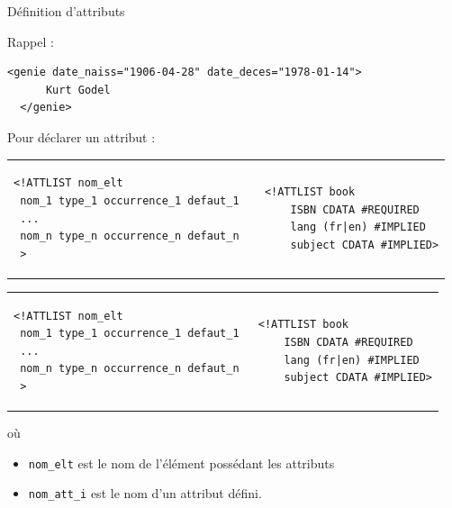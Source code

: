 \begin{frame}{Définition d'attributs}

Rappel :
\begin{lstlisting}[caption={élément \texttt{genie} et ses attributs}]
  <genie date_naiss="1906-04-28" date_deces="1978-01-14">
      Kurt Godel
  </genie>
\end{lstlisting}

\bigskip

Pour déclarer un attribut : \\

\medskip

\begin{tabular}{ll}
\begin{minipage}{0.55\textwidth}
\begin{small}
\begin{verbatim}
<!ATTLIST nom_elt
 nom_1 type_1 occurrence_1 defaut_1  
 ...
 nom_n type_n occurrence_n defaut_n
 > 
\end{verbatim}
\end{small}
\end{minipage}
&
\begin{minipage}{0.40\textwidth}
\begin{lstlisting}
<!ATTLIST book
    ISBN CDATA #REQUIRED 
    lang (fr|en) #IMPLIED
    subject CDATA #IMPLIED>
\end{lstlisting}
\end{minipage}\\
\end{tabular}

\framebreak

\begin{tabular}{ll}
\begin{minipage}{0.55\textwidth}
\begin{small}
\begin{verbatim}
<!ATTLIST nom_elt
 nom_1 type_1 occurrence_1 defaut_1 
 ...
 nom_n type_n occurrence_n defaut_n
 > 
\end{verbatim}
\end{small}
\end{minipage}
&
\begin{minipage}{0.40\textwidth}
\begin{lstlisting}
<!ATTLIST book
    ISBN CDATA #REQUIRED 
    lang (fr|en) #IMPLIED
    subject CDATA #IMPLIED>
\end{lstlisting}
\end{minipage}\\
\end{tabular}
où\\
\begin{itemize}
\item \texttt{nom\_elt} est le nom de l'élément possédant les attributs 
\item \texttt{nom\_att\_i}  est le nom d'un attribut défini. \\
 

\end{itemize}
\end{frame}

